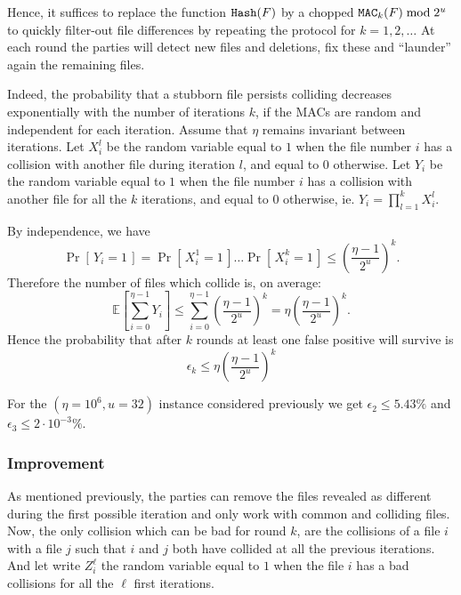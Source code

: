 \documentclass[11pt]{llncs}
\newcommand{\Prob}[1]{{\Pr\left[\,{#1}\,\right]}}
\newcommand{\EE}[1]{{\mathbb{E}\left[{#1}\right]}}
\begin{document}
Hence, it suffices to replace the function $\mbox{{\tt Hash}}(F)$ by a chopped $\mbox{{\tt MAC}}_k(F) \bmod 2^u$ to quickly filter-out file differences by repeating the protocol for $k=1,2,\ldots$ At each round the parties will detect new files and deletions, fix these and ``launder'' again the remaining files.\smallskip

Indeed, the probability that a stubborn file persists colliding decreases exponentially with the number of iterations $k$, if the MACs are random and independent for each iteration.
Assume that $\eta$ remains invariant between iterations.
Let $X^l_i$ be the random variable equal to $1$ when the file number $i$ has a collision with another file during iteration $l$, and equal to $0$ otherwise. Let $Y_i$ be the random variable equal to $1$ when the file number $i$ has a collision with another file for all the $k$ iterations, and equal to $0$ otherwise, ie. $Y_i = \prod_{l=1}^k X^l_i$.

By independence, we have
 \[ \Prob{Y_i = 1} = \Prob{X^1_i = 1} \dots \Prob{X^k_i = 1} \le \left( \frac{\eta -1}{2^u} \right)^k. \]
Therefore the number of files which collide is, on average:
\[
 \EE{\sum_{i=0}^{\eta-1} Y_i} \le \sum_{i=0}^{\eta-1} \left( \frac{\eta -1}{2^u} \right)^k =  \eta \left(\frac{\eta - 1}{2^u}\right)^k.
\]
Hence the probability that after $k$ rounds at least one false positive will survive is
\[
\epsilon_k \le \eta \left(\frac{\eta - 1}{2^u}\right)^k
\]

For the $(\eta=10^6,u=32)$ instance considered previously we get $\epsilon_2 \le 5.43\%$ and $\epsilon_3 \le 2 \cdot 10^{-3} \%$.

\subsubsection{Improvement}

As mentioned previously, the parties can remove the files revealed as different during the first possible iteration and only work with common and colliding files. Now, the only collision which can be bad for round $k$, are the collisions of a file $i$ with a file $j$ such that $i$ and $j$ both have collided at all the previous iterations. And let write $Z^\ell_i$ the random variable equal to $1$ when the file $i$ has a bad collisions for all the $\ell$ first iterations.
\end{document}

